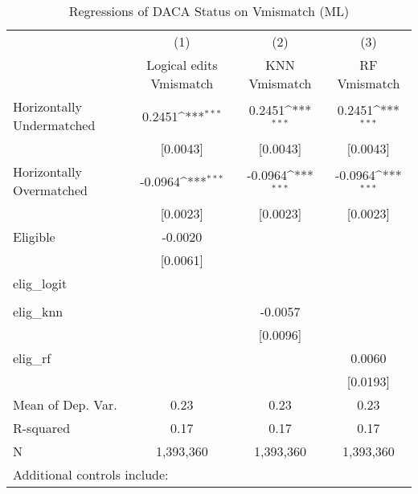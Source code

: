 \begin{table}[htbp]\centering
\def\sym#1{\ifmmode^{#1}\else\(^{#1}\)\fi}
\caption{Regressions of DACA Status on Vmismatch (ML)}
\begin{tabular}{l*{3}{c}}
\toprule
                    &\multicolumn{1}{c}{(1)}         &\multicolumn{1}{c}{(2)}         &\multicolumn{1}{c}{(3)}         \\
                    &Logical edits Vmismatch         &KNN Vmismatch         &RF Vmismatch         \\
\midrule
Horizontally Undermatched&      0.2451\sym{***}&      0.2451\sym{***}&      0.2451\sym{***}\\
                    &    [0.0043]         &    [0.0043]         &    [0.0043]         \\
\addlinespace
Horizontally Overmatched&     -0.0964\sym{***}&     -0.0964\sym{***}&     -0.0964\sym{***}\\
                    &    [0.0023]         &    [0.0023]         &    [0.0023]         \\
\addlinespace
Eligible            &     -0.0020         &                     &                     \\
                    &    [0.0061]         &                     &                     \\
\addlinespace
elig\_logit          &                     &                     &                     \\
                    &                     &                     &                     \\
\addlinespace
elig\_knn            &                     &     -0.0057         &                     \\
                    &                     &    [0.0096]         &                     \\
\addlinespace
elig\_rf             &                     &                     &      0.0060         \\
                    &                     &                     &    [0.0193]         \\
\midrule
Mean of Dep. Var.   &        0.23         &        0.23         &        0.23         \\
R-squared           &        0.17         &        0.17         &        0.17         \\
N                   &   1,393,360         &   1,393,360         &   1,393,360         \\
\bottomrule
\multicolumn{4}{l}{\footnotesize Additional controls include:}\\

\end{tabular}
\end{table}
